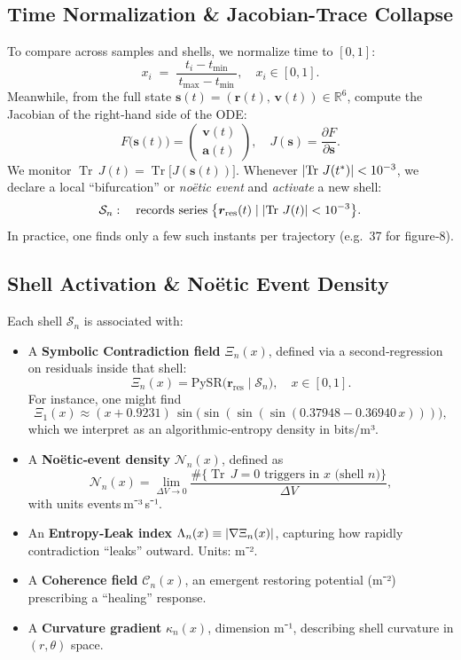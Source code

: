 \documentclass[11pt]{article}
\newcommand{\Shell}{\mathcal{S}}
\newcommand{\Contradiction}{\Xi}
\newcommand{\Coherence}{\mathcal{C}}
\newcommand{\Noetic}{\mathcal{N}}
\newcommand{\Leak}{\Lambda}
\newcommand{\Curv}{\kappa}
\newcommand{\TrJ}{\operatorname{Tr}\,J}
\let\CustomAbs\abs
\begin{document}
\subsection{Time Normalization \& Jacobian-Trace Collapse}
To compare across samples and shells, we normalize time to \([0,1]\):
\[
  x_i \;=\; \frac{\,t_i - t_{\min}\,}{\,t_{\max} - t_{\min}\,},\quad x_i\in[0,1].
\]
Meanwhile, from the full state \(\bm s(t) = (\bm r(t),\,\bm v(t))\in\mathbb R^6\), compute the Jacobian of the right‐hand side of the ODE:
\[
  F\bigl(\bm s(t)\bigr) = 
  \begin{pmatrix}
    \bm v(t) \\[6pt]
    \bm a(t)
  \end{pmatrix},\quad 
  J(\bm s) = \frac{\partial F}{\partial \bm s}.
\]
We monitor \(\TrJ(t) = \operatorname{Tr}\bigl[J(\bm s(t))\bigr]\). Whenever \(\CustomAbs{\TrJ(t^\ast)} < 10^{-3}\), we declare a local “bifurcation” or \emph{noëtic event} and \emph{activate} a new shell:
\[
  \Shell_n: \quad \text{records series}\;\bigl\{\bm r_{\mathrm{res}}(t)\mid \CustomAbs{\TrJ(t)}<10^{-3}\bigr\}.
\]
In practice, one finds only a few such instants per trajectory (e.g.\ 37 for figure‐8).

\subsection{Shell Activation \& Noëtic Event Density}
Each shell \(\Shell_n\) is associated with:
\begin{itemize}[itemsep=1pt]
  \item A \textbf{Symbolic Contradiction field} \(\Contradiction_n(x)\), defined via a second‐regression on residuals inside that shell:
    \[
      \Contradiction_n(x) 
      = \mathrm{PySR}\bigl(\bm r_{\mathrm{res}}\mid \Shell_n\bigr), 
      \quad x \in [0,1].
    \]
    For instance, one might find 
    \[
      \Contradiction_1(x) \approx (x + 0.9231)\,\sin\bigl(\sin(\sin(\sin(0.37948 - 0.36940\,x)))\bigr),
    \]
    which we interpret as an algorithmic‐entropy density in bits/m³.  
  \item A \textbf{Noëtic‐event density} \(\Noetic_n(x)\), defined as
    \[
      \Noetic_n(x) = \lim_{\Delta V\to0} \frac{\#\{\TrJ=0 \text{ triggers in } x \text{ (shell } n)\}}{\Delta V},
    \]
    with units events m⁻³ s⁻¹.
  \item An \textbf{Entropy‐Leak index} \(\Leak_n(x) \equiv \CustomAbs{\nabla \Contradiction_n(x)}\), capturing how rapidly contradiction “leaks” outward. Units: m⁻².
  \item A \textbf{Coherence field} \(\Coherence_n(x)\), an emergent restoring potential (m⁻²) prescribing a “healing” response.
  \item A \textbf{Curvature gradient} \(\Curv_n(x)\), dimension m⁻¹, describing shell curvature in \((r,\theta)\) space.
\end{itemize}
\end{document}
